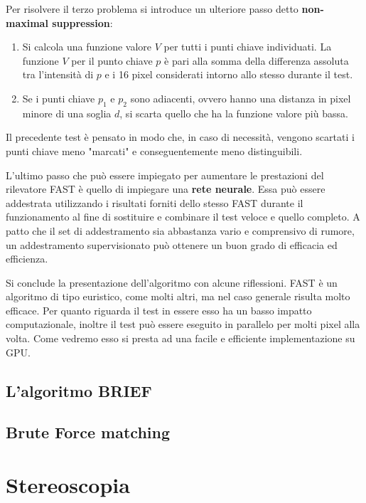 Per risolvere il terzo problema si introduce un ulteriore passo detto \textbf{non-maximal suppression}:
\begin{enumerate}
	\item Si calcola una funzione valore $V$ per tutti i punti chiave individuati. La funzione $V$ per il punto chiave $p$ è pari alla somma della differenza assoluta tra l'intensità di $p$ e i 16 pixel considerati intorno allo stesso durante il test.
	\item Se i punti chiave $p_1$ e $p_2$ sono adiacenti, ovvero hanno una distanza in pixel minore di una soglia $d$, si scarta quello che ha la funzione valore più bassa.
\end{enumerate}
Il precedente test è pensato in modo che, in caso di necessità, vengono scartati i punti chiave meno "marcati" e conseguentemente meno distinguibili. 

L'ultimo passo che può essere impiegato per aumentare le prestazioni del rilevatore FAST è quello di impiegare una \textbf{rete neurale}. Essa può essere addestrata utilizzando i risultati forniti dello stesso FAST durante il funzionamento al fine di sostituire e combinare il test veloce e quello completo. A patto che il set di addestramento sia abbastanza vario e comprensivo di rumore, un addestramento supervisionato può ottenere un buon grado di efficacia ed efficienza. 

Si conclude la presentazione dell'algoritmo con alcune riflessioni. FAST è un algoritmo di tipo euristico, come molti altri, ma nel caso generale risulta molto efficace. Per quanto riguarda il test in essere esso ha un basso impatto computazionale, inoltre il test può essere eseguito in parallelo per molti pixel alla volta. Come vedremo esso si presta ad una facile e efficiente implementazione su GPU.

\subsection{L'algoritmo BRIEF}
\label{sec:det:brief}

\subsection{Brute Force matching}
\label{sec:det:bmmatch}


\section{Stereoscopia}
\label{sec:stereo}


